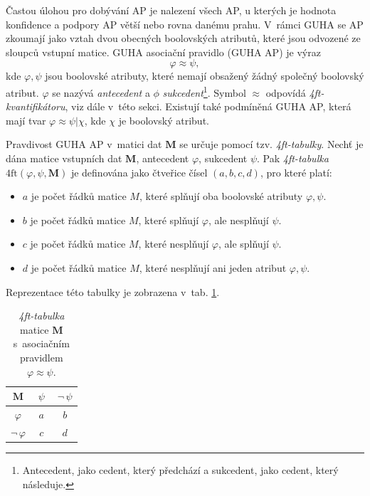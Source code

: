 Častou úlohou pro dobývání AP je nalezení všech AP, u kterých je hodnota konfidence a podpory AP větší nebo rovna danému prahu. V~rámci GUHA se AP zkoumají jako vztah dvou obecných boolovských atributů, které jsou odvozené ze sloupců vstupní matice. GUHA asociační pravidlo (GUHA AP) je 
výraz 
\begin{equation}
    \varphi \approx \psi, 
\end{equation}
kde $\varphi, \psi$ jsou boolovské atributy, které nemají obsažený žádný společný boolovský atribut. $\varphi$ se nazývá \emph{antecedent} a $\phi$ \emph{sukcedent}\footnote{Antecedent, jako cedent, který předchází a sukcedent, jako cedent, který následuje.}. Symbol $\approx$ odpovídá \emph{4ft-kvantifikátoru}, viz dále v~této sekci. Existují také podmíněná GUHA AP, která mají tvar  $\varphi \approx \psi | \chi$, kde $\chi$ je boolovský atribut.\cite{bib:GUHA}

Pravdivost GUHA AP v~matici dat $\mathbf{M}$ se určuje pomocí tzv. \emph{4ft-tabulky}. Nechť je dána matice vstupních dat $\mathbf{M}$, antecedent $\varphi$, sukcedent $\psi$. Pak \emph{4ft-tabulka} $\mathrm{4ft}(\varphi,\psi,\mathbf{M})$ je definována jako čtveřice čísel $(a,b,c,d)$, pro které platí:
\begin{itemize}
    \itemsep0em
    \item $a$ je počet řádků matice $M$, které splňují oba boolovské atributy $\varphi, \psi$.
    \item $b$ je počet řádků matice $M$, které splňují $\varphi$, ale nesplňují $\psi$.
    \item $c$ je počet řádků matice $M$, které nesplňují $\varphi$, ale splňují $\psi$.
    \item $d$ je počet řádků matice $M$, které nesplňují ani jeden atribut $\varphi, \psi$.\cite{bib:GUHA}
\end{itemize}
Reprezentace této tabulky je zobrazena v~tab. \ref*{tab:GUHA:tabulka}.

\begin{table}[hbtp!]
    \begin{center}
            \captionsetup{justification=centering}
    \caption{\emph{4ft-tabulka} matice $\mathbf{M}$ s~asociačním pravidlem $\varphi \approx \psi$.}
    \begin{tabular}{c|c|c}
        $\mathbf{M}$ & $ \;\psi \;$& $\neg\,\psi$ \\
        \hline
        $\varphi$ & $a$& $b$ \\
        \hline
        $\neg\,\varphi$ & $c$& $d$ \\
        \end{tabular}
    \label{tab:GUHA:tabulka}
\end{center}
\end{table}

